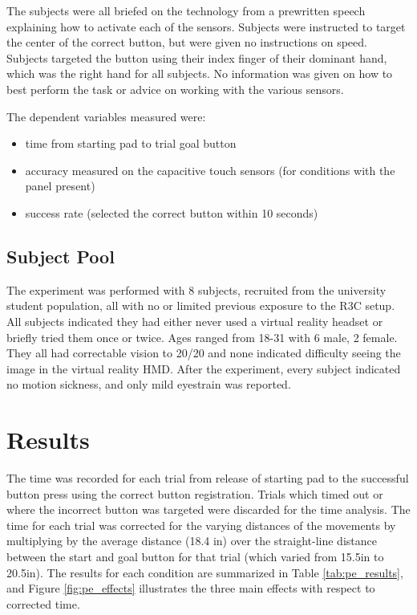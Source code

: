 The subjects were all briefed on the technology from a prewritten speech explaining how to activate each of the sensors.
Subjects were instructed to target the center of the correct button, but were given no instructions on speed.
Subjects targeted the button using their index finger of their dominant hand, which was the right hand for all subjects.
No information was given on how to best perform the task or advice on working with the various sensors.

The dependent variables measured were:
\begin{itemize}
    \item time from starting pad to trial goal button
    \item accuracy measured on the capacitive touch sensors (for conditions with the panel present)
    \item success rate (selected the correct button within 10 seconds)
\end{itemize}

\subsection{Subject Pool}
The experiment was performed with 8 subjects, recruited from the university student population, all with no or limited previous exposure to the R3C setup.
All subjects indicated they had either never used a virtual reality headset or briefly tried them once or twice.
Ages ranged from 18-31 with 6 male, 2 female.
They all had correctable vision to 20/20 and none indicated difficulty seeing the image in the virtual reality HMD.
After the experiment, every subject indicated no motion sickness, and only mild eyestrain was reported.

\section{Results}

The time was recorded for each trial from release of starting pad to the successful button press using the correct button registration.
Trials which timed out or where the incorrect button was targeted were discarded for the time analysis.
The time for each trial was corrected for the varying distances of the movements by multiplying by the average distance (18.4 in) over the straight-line distance between the start and goal button for that trial (which varied from 15.5in to 20.5in).
The results for each condition are summarized in Table \ref{tab:pe_results}, and Figure \ref{fig:pe_effects} illustrates the three main effects with respect to corrected time.

